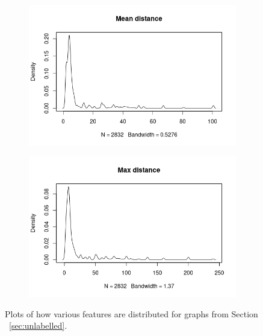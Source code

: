 \documentclass{l4proj}
\theoremstyle{definition}
\theoremstyle{remark}
\begin{document}
\begin{appendices}
\begin{figure}
\begin{subfigure}[t]{0.49\textwidth}
    \end{subfigure}
    \begin{subfigure}[t]{0.49\textwidth}
      \centering
      \includegraphics[width=\textwidth]{images/sip_meandist.png}
    \end{subfigure}
    \begin{subfigure}[t]{0.49\textwidth}
      \centering
      \includegraphics[width=\textwidth]{images/sip_maxdist.png}
    \end{subfigure}
    \caption{Plots of how various features are distributed for graphs from Section
      ~\ref{sec:unlabelled}.}
    \label{fig:sip_features1}
  \end{figure}


\end{appendices}
\end{document}
